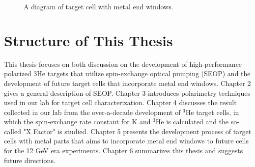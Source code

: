 \begin{figure}[t!]
	\centering
	\caption{{A diagram of target cell with metal end windows. }}
	\label{metal_end_windows}
\end{figure}

\section{Structure of This Thesis}

This thesis focuses on both discussion on the development of high-performance polarized $3$He targets that utilize spin-exchange optical pumping (SEOP) and the development of future target cells that incorporate metal end windows. Chapter 2 gives a general description of SEOP. Chapter 3 introduces polarimetry techniques used in our lab for target cell characterization. Chapter 4 discusses the result collected in our lab from the over-a-decade development of $^3$He target cells, in which the spin-exchange rate constant for K and $^3$He is calculated and the so-called "X Factor" is studied. Chapter 5 presents the development process of target cells with metal parts that aims to incorporate metal end windows to future cells for the 12 GeV era experiments. Chapter 6 summarizes this thesis and suggests future directions.













